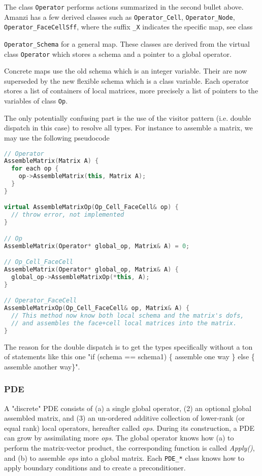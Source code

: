 The class {\tt Operator} performs actions summarized in the second bullet above. 
Amanzi has a few derived classes such as {\tt Operator\_Cell}, {\tt Operator\_Node}, 
{\tt Operator\_FaceCellSff}, where the suffix {\tt \_X} indicates the specific map,
see class {{\tt Operator\_Schema} for a general map.
These classes are derived from the virtual class {\tt Operator} which stores a
schema and a pointer to a global operator.

Concrete maps use the old schema which is an integer variable.
Their are now superseded by the new flexible schema which is a class variable.
Each operator stores a list of containers of local matrices, more precisely 
a list of pointers to the variables of class {\tt Op}.

The only potentially confusing part is the use of the visitor pattern (i.e. double 
dispatch in this case) to resolve all types.  
For instance to assemble a matrix, we may use the following pseudocode

\begin{lstlisting}[language=C++]
// Operator
AssembleMatrix(Matrix A) {
  for each op {
    op->AssembleMatrix(this, Matrix A);
  }
}

virtual AssembleMatrixOp(Op_Cell_FaceCell& op) { 
  // throw error, not implemented
}

// Op
AssembleMatrix(Operator* global_op, Matrix& A) = 0;

// Op_Cell_FaceCell
AssembleMatrix(Operator* global_op, Matrix& A) {
  global_op->AssembleMatrixOp(*this, A);
}

// Operator_FaceCell
AssembleMatrixOp(Op_Cell_FaceCell& op, Matrix& A) {
  // This method now know both local schema and the matrix's dofs, 
  // and assembles the face+cell local matrices into the matrix.
}
\end{lstlisting}

The reason for the double dispatch is to get the types specifically
without a ton of statements like this one "if (schema == schema1) 
\{ assemble one way \} else \{ assemble another way\}".


\subsubsection{PDE}
A "discrete" PDE consists of (a) a single global operator, (2) an 
optional global assembled matrix, and (3) an un-ordered additive collection of 
lower-rank (or equal rank) local operators, hereafter called {\it ops}. 
During its construction, a PDE can grow by assimilating more {\it ops}. 
The global operator knows how (a) to perform the matrix-vector product, 
the corresponding function is called {\it Apply()}, and (b) to assemble {\it ops} into a global matrix.
Each {\tt PDE\_*} class knows how to apply boundary conditions and to create a preconditioner.

}
